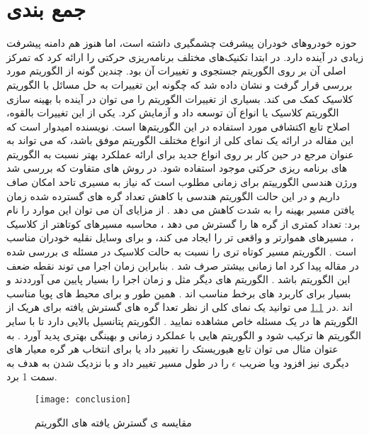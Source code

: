 

\chapter{جمع بندی}

حوزه خودروهای خودران پیشرفت چشمگیری داشته است، اما هنوز هم دامنه پیشرفت زیادی در آینده دارد. 
\cite{paliwal2023survey}
در ابتدا تکنیک‌های مختلف برنامه‌ریزی حرکتی را ارائه کرد که تمرکز اصلی آن بر روی الگوریتم جستجوی
  و تغییرات آن بود. چندین گونه از الگوریتم   مورد بررسی قرار گرفت و نشان داده شد که چگونه این تغییرات به حل مسائل با الگوریتم کلاسیک  کمک می کند. بسیاری از تغییرات الگوریتم   را می توان در آینده با بهینه سازی الگوریتم کلاسیک یا انواع آن توسعه داد و آزمایش کرد. یکی از این تغییرات بالقوه، اصلاح تابع اکتشافی مورد استفاده در این الگوریتم‌ها است. نویسنده امیدوار است که این مقاله در ارائه یک نمای کلی از انواع مختلف الگوریتم   موفق باشد، که می تواند به عنوان مرجع در حین کار بر روی انواع جدید برای ارائه عملکرد بهتر نسبت به الگوریتم های برنامه ریزی حرکتی موجود استفاده شود.
در روش های متفاوت که بررسی شد ورژن هندسی الگورییتم 
برای زمانی مطلوب است که نیاز به مسیری تاحد امکان صاف داریم و در این حالت الگوریتم هندسی با کاهش تعداد گره های گسترده شده زمان یافتن مسیر بهینه را به شدت کاهش می دهد . از مزایای آن می توان این موارد را نام برد:
تعداد کمتری از گره ها را گسترش می دهد ،
محاسبه مسیرهای کوتاهتر از کلاسیک ،
مسیرهای هموارتر و واقعی تر را ایجاد می کند، 
و برای وسایل نقلیه خودران مناسب است .
الگوریتم 
مسیر کوتاه تری را نسبت به حالت کلاسیک در مسئله ی بررسی شده در مقاله پیدا کرد اما زمانی بیشتر صرف شد . بنابراین زمان اجرا می توند نقطه ضعف این الگوریتم باشد .
الگوریتم های دیگر مثل 
و
زمان اجرا را بسیار پایین می آورددند و بسیار برای کاربرد های برخط مناسب اند .
همین طور 
و
برای محیط های پویا مناسب اند .در 
\ref{conclusion}
 می توانید یک نمای کلی از نظر تعدا گره های گسترش یافته برای هریک از الگوریتم ها در یک مسئله خاص مشاهده نمایید .
 الگوریتم 
 پتانسیل بالایی دارد تا با سایر الگوریتم ها ترکیب شود و الگوریتم هایی با عملکرد زمانی و بهینگی بهتری پدید آورد . به عتوان مثال می توان تابع هیوریستک را تغییر داد یا برای انتخاب هر گره معیار های دیگری نیز افزود ویا ضریب 
 $\epsilon$
 را در طول مسیر تغییر داد و با نزدیک شدن به هدف به سمت 1 برد. 
\begin{figure}[h]
	\texttt{[image: conclusion]}
	\centering
	\caption{مقایسه ی گسترش یافته های الگوریتم }
	\cite{paliwal2023survey}
	\label{conclusion}
\end{figure}
\